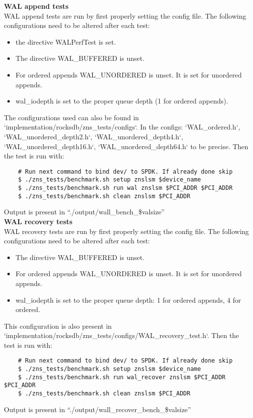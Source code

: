 \textbf{WAL append tests}\\
WAL append tests are run by first properly setting the config file. The following configurations need to be altered after each test:
\begin{itemize}
    \item the directive WALPerfTest is set.
    \item The directive WAL\_BUFFERED is unset.
    \item For ordered appends WAL\_UNORDERED is unset. It is set for unordered appends.
    \item wal\_iodepth is set to the proper queue depth (1 for ordered appends).
\end{itemize}
The configurations used can also be found in `implementation/rocksdb/zns\_tests/configs`. In the configs: `WAL\_ordered.h`, `WAL\_unordered\_depth2.h`, `WAL\_unordered\_depth4.h`, `WAL\_unordered\_depth16.h`, `WAL\_unordered\_depth64.h` to be precise.
Then the test is run with: 
\begin{verbatim}
    # Run next command to bind dev/ to SPDK. If already done skip
    $ ./zns_tests/benchmark.sh setup znslsm $device_name 
    $ ./zns_tests/benchmark.sh run wal znslsm $PCI_ADDR $PCI_ADDR
    $ ./zns_tests/benchmark.sh clean znslsm $PCI_ADDR
\end{verbatim}
Output is present in ``./output/wall\_bench\_\$valsize''
\\
\textbf{WAL recovery tests}\\
WAL recovery tests are run by first properly setting the config file. The following configurations need to be altered after each test:
\begin{itemize}
    \item The directive WAL\_BUFFERED is unset.
    \item For ordered appends WAL\_UNORDERED is unset. It is set for unordered appends.
    \item wal\_iodepth is set to the proper queue depth: 1 for ordered appends, 4 for ordered.
\end{itemize}
This configuration is also present in `implementation/rocksdb/zns\_tests/configs/WAL\_recovery\_test.h`.
Then the test is run with: 
\begin{verbatim}
    # Run next command to bind dev/ to SPDK. If already done skip
    $ ./zns_tests/benchmark.sh setup znslsm $device_name 
    $ ./zns_tests/benchmark.sh run wal_recover znslsm $PCI_ADDR $PCI_ADDR
    $ ./zns_tests/benchmark.sh clean znslsm $PCI_ADDR
\end{verbatim}
Output is present in ``./output/wall\_recover\_bench\_\$valsize''

